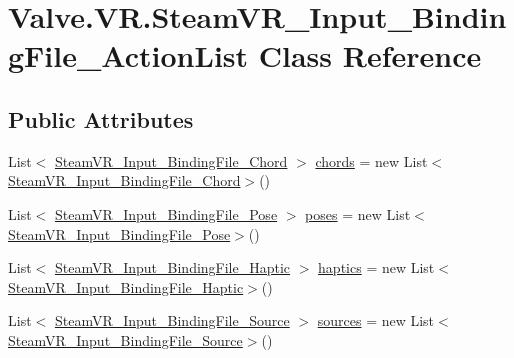 \hypertarget{class_valve_1_1_v_r_1_1_steam_v_r___input___binding_file___action_list}{}\section{Valve.\+V\+R.\+Steam\+V\+R\+\_\+\+Input\+\_\+\+Binding\+File\+\_\+\+Action\+List Class Reference}
\label{class_valve_1_1_v_r_1_1_steam_v_r___input___binding_file___action_list}
\subsection*{Public Attributes}
\begin{DoxyCompactItemize}
\item 
List$<$ \mbox{\hyperlink{class_valve_1_1_v_r_1_1_steam_v_r___input___binding_file___chord}{Steam\+V\+R\+\_\+\+Input\+\_\+\+Binding\+File\+\_\+\+Chord}} $>$ \mbox{\hyperlink{class_valve_1_1_v_r_1_1_steam_v_r___input___binding_file___action_list_a99ae630664034bccb2ce8ede38f9b9db}{chords}} = new List$<$\mbox{\hyperlink{class_valve_1_1_v_r_1_1_steam_v_r___input___binding_file___chord}{Steam\+V\+R\+\_\+\+Input\+\_\+\+Binding\+File\+\_\+\+Chord}}$>$()
\item 
List$<$ \mbox{\hyperlink{class_valve_1_1_v_r_1_1_steam_v_r___input___binding_file___pose}{Steam\+V\+R\+\_\+\+Input\+\_\+\+Binding\+File\+\_\+\+Pose}} $>$ \mbox{\hyperlink{class_valve_1_1_v_r_1_1_steam_v_r___input___binding_file___action_list_a47e84a3fd123fcc43bcdb43c2772b36f}{poses}} = new List$<$\mbox{\hyperlink{class_valve_1_1_v_r_1_1_steam_v_r___input___binding_file___pose}{Steam\+V\+R\+\_\+\+Input\+\_\+\+Binding\+File\+\_\+\+Pose}}$>$()
\item 
List$<$ \mbox{\hyperlink{class_valve_1_1_v_r_1_1_steam_v_r___input___binding_file___haptic}{Steam\+V\+R\+\_\+\+Input\+\_\+\+Binding\+File\+\_\+\+Haptic}} $>$ \mbox{\hyperlink{class_valve_1_1_v_r_1_1_steam_v_r___input___binding_file___action_list_a90284dfe5bd82029b9cc3dc827aaffdf}{haptics}} = new List$<$\mbox{\hyperlink{class_valve_1_1_v_r_1_1_steam_v_r___input___binding_file___haptic}{Steam\+V\+R\+\_\+\+Input\+\_\+\+Binding\+File\+\_\+\+Haptic}}$>$()
\item 
List$<$ \mbox{\hyperlink{class_valve_1_1_v_r_1_1_steam_v_r___input___binding_file___source}{Steam\+V\+R\+\_\+\+Input\+\_\+\+Binding\+File\+\_\+\+Source}} $>$ \mbox{\hyperlink{class_valve_1_1_v_r_1_1_steam_v_r___input___binding_file___action_list_a0f87391e1af14c9db96cd029d356d88a}{sources}} = new List$<$\mbox{\hyperlink{class_valve_1_1_v_r_1_1_steam_v_r___input___binding_file___source}{Steam\+V\+R\+\_\+\+Input\+\_\+\+Binding\+File\+\_\+\+Source}}$>$()

\end{DoxyCompactItemize}
